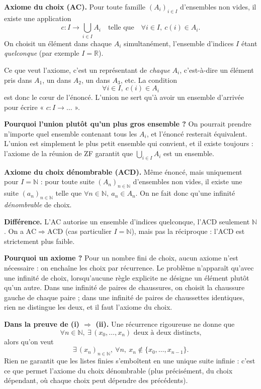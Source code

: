\documentclass[a4paper,11pt]{article}
\begin{document}
\begin{remarque}
\textbf{Axiome du choix (AC).} Pour toute famille $(A_i)_{i \in I}$ d'ensembles non vides, il existe une application
\[
  c : I \to \bigcup_{i \in I} A_i
  \quad\text{telle que}\quad
  \forall i \in I,\ c(i) \in A_i .
\]
On choisit un élément dans chaque $A_i$ simultanément, l'ensemble d'indices $I$ étant \emph{quelconque} (par exemple $I = \mathbb{R}$).

Ce que veut l'axiome, c'est un représentant de \emph{chaque} $A_i$,
c'est-à-dire un élément pris dans $A_1$, un dans $A_2$, un dans $A_3$, etc.
La condition
\[
  \forall i \in I,\ c(i) \in A_i
\]
est donc le cœur de l'énoncé. L'union ne sert qu'à avoir un ensemble
d'arrivée pour écrire « $c : I \to \dots$ ».

\textbf{Pourquoi l'union plutôt qu'un plus gros ensemble ?}
On pourrait prendre n'importe quel ensemble contenant tous les $A_i$,
et l'énoncé resterait équivalent. L'union est simplement le plus petit
ensemble qui convient, et il existe toujours : l'axiome de la réunion de ZF
garantit que $\bigcup_{i \in I} A_i$ est un ensemble.

\medskip
\textbf{Axiome du choix dénombrable (ACD).} Même énoncé, mais uniquement pour $I = \mathbb{N}$ : pour toute suite $(A_n)_{n \in \mathbb{N}}$ d'ensembles non vides, il existe une suite $(a_n)_{n \in \mathbb{N}}$ telle que $\forall n \in \mathbb{N},\ a_n \in A_n$. On ne fait donc qu'une infinité \emph{dénombrable} de choix.

\medskip
\textbf{Différence.} L'AC autorise un ensemble d'indices quelconque, l'ACD seulement $\mathbb{N}$. On a $\mathrm{AC} \Rightarrow \mathrm{ACD}$ (cas particulier $I = \mathbb{N}$), mais pas la réciproque : l'ACD est strictement plus faible.

\medskip
\textbf{Pourquoi un axiome ?} Pour un nombre fini de choix, aucun axiome n'est nécessaire : on enchaîne les choix par récurrence. Le problème n'apparaît qu'avec une infinité de choix, lorsqu'aucune règle explicite ne désigne un élément plutôt qu'un autre. Dans une infinité de paires de chaussures, on choisit la chaussure gauche de chaque paire ; dans une infinité de paires de chaussettes identiques, rien ne distingue les deux, et il faut l'axiome du choix.

\medskip
\textbf{Dans la preuve de (i) $\Rightarrow$ (ii).} Une récurrence rigoureuse ne donne que
\[
  \forall n \in \mathbb{N},\ \exists\, (x_0,\dots,x_n) \text{ deux à deux distincts,}
\]
alors qu'on veut
\[
  \exists\, (x_n)_{n \in \mathbb{N}},\ \forall n,\ x_n \notin \{x_0,\dots,x_{n-1}\}.
\]
Rien ne garantit que les listes finies s'emboîtent en une unique suite infinie : c'est ce que permet l'axiome du choix dénombrable (plus précisément, du choix dépendant, où chaque choix peut dépendre des précédents).
\end{remarque}
\end{document}
